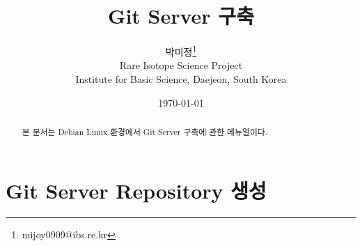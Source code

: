 \documentclass[11pt
  , a4paper
  , article
  , oneside
]{memoir}
\begin{document}
 
\newcommand{\technumber}{
  RAON Control-Document Series\\
  Revision : v0.1,   Release : December. 01. 2015}
\title{\textbf{Git Server 구축}}

\author{박미정\thanks{mijoy0909@ibs.re.kr} \\
  Rare Isotope Science Project\\
  Institute for Basic Science, Daejeon, South Korea
}
\date{\today}


\renewcommand{\maketitlehooka}{\begin{flushright}\textsf{\technumber}\end{flushright}}

\maketitle

\begin{abstract}
본 문서는 Debian Linux 환경에서 Git Server 구축에 관한 메뉴얼이다. 
\end{abstract}


\chapter{Git Server Repository 생성}
\end{document}

